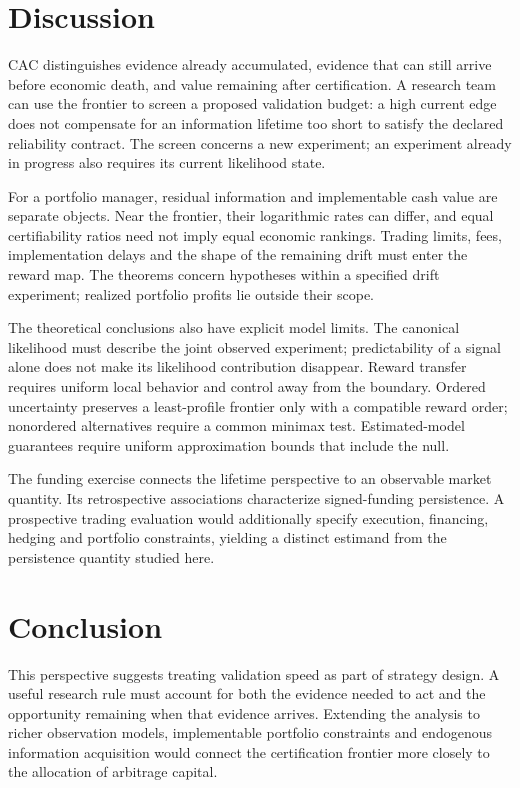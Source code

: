 \documentclass[11pt]{article}
\numberwithin{equation}{section}
\theoremstyle{plain}
\theoremstyle{definition}
\theoremstyle{remark}
\begin{document}
\section{Discussion}\label{discussion}

CAC distinguishes evidence already accumulated, evidence that can still
arrive before economic death, and value remaining after certification.
A research team can use the frontier to screen a proposed validation
budget: a high current edge does not compensate for an information
lifetime too short to satisfy the declared reliability contract.
The screen concerns a new experiment; an experiment already in progress
also requires its current likelihood state.

For a portfolio manager, residual information and implementable cash
value are separate objects. Near the frontier, their logarithmic rates
can differ, and equal certifiability ratios need not imply equal economic
rankings. Trading limits, fees, implementation delays and the shape of
the remaining drift must enter the reward map. The theorems concern hypotheses within a specified drift experiment; realized portfolio profits lie outside their scope.

The theoretical conclusions also have explicit model limits. The
canonical likelihood must describe the joint observed experiment;
predictability of a signal alone does not make its likelihood contribution
disappear. Reward transfer requires uniform local behavior and control
away from the boundary. Ordered uncertainty preserves a least-profile
frontier only with a compatible reward order; nonordered alternatives
require a common minimax test. Estimated-model guarantees require uniform approximation bounds that include the null.

The funding exercise connects the lifetime perspective to an observable market quantity. Its retrospective associations characterize signed-funding persistence. A prospective trading evaluation would additionally specify execution, financing, hedging and portfolio constraints, yielding a distinct estimand from the persistence quantity studied here.
\section{Conclusion}\label{conclusion}

This perspective suggests treating validation speed as part of strategy design. A useful research rule must account for both the evidence needed to act and the opportunity remaining when that evidence arrives. Extending the analysis to richer observation models, implementable portfolio constraints and endogenous information acquisition would connect the certification frontier more closely to the allocation of arbitrage capital.
\end{document}

